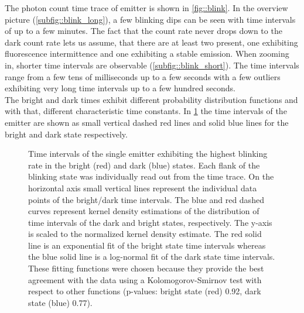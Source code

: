 		The photon count time trace of emitter \emnarrow is shown in \cref{fig::blink}.
		In the overview picture (\cref{subfig::blink_long}), a few blinking dips can be seen with time intervals of up to a few minutes.
		The fact that the count rate never drops down to the dark count rate lets us assume, that there are at least two \sivs present, one exhibiting fluorescence intermittence and one exhibiting a stable emission.
		When zooming in, shorter time intervals are observable (\cref{subfig::blink_short}).
		The time intervals range from a few tens of milliseconds up to a few seconds with a few outliers exhibiting very long time intervals up to a few hundred seconds.
		\\
		The bright and dark times exhibit different probability distribution functions and with that, different characteristic time constants.
		In \cref{fig::fit_blink_distr} the time intervals of the emitter are shown as small vertical dashed red lines and solid blue lines for the bright and dark state respectively.

		\begin{figure}[htp]
			\centering
			\caption[Distributions of brigth and dark state intervals]{Time intervals of the single emitter exhibiting the highest blinking rate in the bright (red) and dark (blue) states. Each flank of the blinking state was individually read out from the \pl time trace. On the horizontal axis small vertical lines represent the individual data points of the bright/dark time intervals. The blue and red dashed curves represent kernel density estimations of the distribution of time intervals of the dark and bright states, respectively. The y-axis is scaled to the normalized kernel density estimate. The red solid line is an exponential fit of the bright state time intervals whereas the blue solid line is a log-normal fit of the dark state time intervals. These fitting functions were chosen because they provide the best agreement with the data using a Kolomogorov-Smirnov test with respect to other functions (p-values: bright state (red) 0.92, dark state (blue) 0.77).}
			\label{fig::fit_blink_distr}
		\end{figure}

